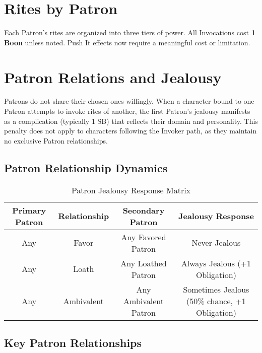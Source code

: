 \documentclass[12pt,twoside]{book}
\begin{document}
\section{Rites by Patron}
Each Patron's rites are organized into three tiers of power. All Invocations cost \textbf{1 Boon} unless noted. Push It effects now require a meaningful cost or limitation.




\section{Patron Relations and Jealousy}

Patrons do not share their chosen ones willingly. When a character bound to one Patron attempts to invoke rites of another, the first Patron's jealousy manifests as a complication (typically 1 SB) that reflects their domain and personality. This penalty does not apply to characters following the Invoker path, as they maintain no exclusive Patron relationships.

\subsection{Patron Relationship Dynamics}

\begin{table}[htbp]
\centering
\begin{tabular}{|c|c|c|c|}
\hline
\textbf{Primary Patron} & \textbf{Relationship} & \textbf{Secondary Patron} & \textbf{Jealousy Response} \\
\hline
Any & Favor & Any Favored Patron & Never Jealous \\
\hline
Any & Loath & Any Loathed Patron & Always Jealous (+1 Obligation) \\
\hline
Any & Ambivalent & Any Ambivalent Patron & Sometimes Jealous (50\% chance, +1 Obligation) \\
\hline
\end{tabular}
\caption{Patron Jealousy Response Matrix}
\end{table}

\subsection{Key Patron Relationships}
\end{document}
